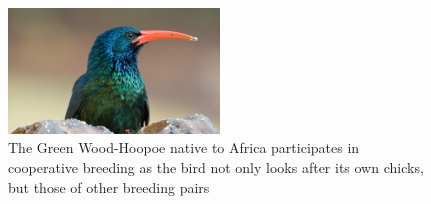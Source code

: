 \documentclass[]{final_report}
\begin{document}
\begin{figure}
	\center
	\includegraphics[width=0.5\textwidth]{green-wood-hoopoe.jpg}
	\caption{The Green Wood-Hoopoe native to Africa participates in cooperative breeding as the bird not only looks after its own chicks, but those of other breeding pairs~\cite{hoopoe}}
	\label{fig:hoopoe}
\end{figure}
\end{document}
